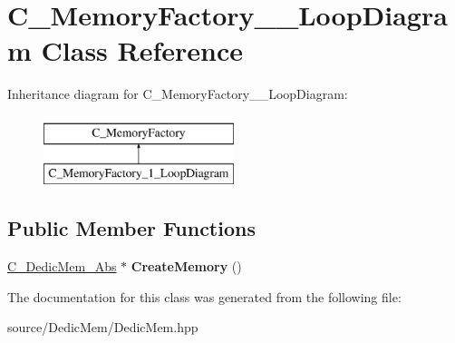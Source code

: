 \hypertarget{class_c___memory_factory__1___loop_diagram}{\section{C\-\_\-\-Memory\-Factory\-\_\-\_\-\-Loop\-Diagram Class Reference}
\label{class_c___memory_factory__1___loop_diagram}
}
Inheritance diagram for C\-\_\-\-Memory\-Factory\-\_\-\_\-\-Loop\-Diagram\-:\begin{figure}[H]
\begin{center}
\leavevmode
\includegraphics[height=2.000000cm]{class_c___memory_factory__1___loop_diagram}
\end{center}
\end{figure}
\subsection*{Public Member Functions}
\begin{DoxyCompactItemize}
\item 
\hypertarget{class_c___memory_factory__1___loop_diagram_abf0b04efb9ecb9733a5d4cdff273e9a5}{\hyperlink{class_c___dedic_mem___abs}{C\-\_\-\-Dedic\-Mem\-\_\-\-Abs} $\ast$ {\bfseries Create\-Memory} ()}\label{class_c___memory_factory__1___loop_diagram_abf0b04efb9ecb9733a5d4cdff273e9a5}

\end{DoxyCompactItemize}


The documentation for this class was generated from the following file\-:\begin{DoxyCompactItemize}
\item 
source/\-Dedic\-Mem/Dedic\-Mem.\-hpp\end{DoxyCompactItemize}
